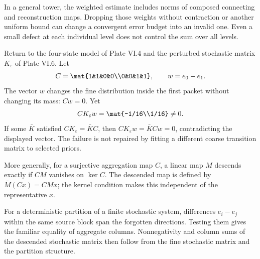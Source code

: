 In a general tower, the weighted estimate includes norms of composed connecting and reconstruction maps. Dropping those weights without contraction or another uniform bound can change a convergent error budget into an invalid one. Even a small defect at each individual level does not control the sum over all levels.

Return to the four-state model of Plate VI.4 and the perturbed stochastic matrix $K_\varepsilon$ of Plate VI.6. Let
\[
C=\mat{1&1&0&0\\0&0&1&1},\qquad w=e_0-e_1.
\]
The vector $w$ changes the fine distribution inside the first packet without changing its mass: $Cw=0$. Yet
\[
CK_\varepsilon w=\mat{-1/16\\1/16}\ne0.
\]
If some $\bar K$ satisfied $CK_\varepsilon=\bar KC$, then $CK_\varepsilon w=\bar KCw=0$, contradicting the displayed vector. The failure is not repaired by fitting a different coarse transition matrix to selected priors.

More generally, for a surjective aggregation map $C$, a linear map $M$ descends exactly if $CM$ vanishes on $\ker C$. The descended map is defined by $\bar M(Cx)=CMx$; the kernel condition makes this independent of the representative $x$.

For a deterministic partition of a finite stochastic system, differences $e_i-e_j$ within the same source block span the forgotten directions. Testing them gives the familiar equality of aggregate columns. Nonnegativity and column sums of the descended stochastic matrix then follow from the fine stochastic matrix and the partition structure.

